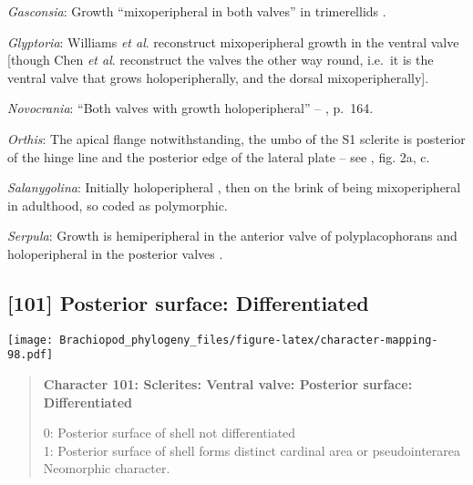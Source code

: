 \documentclass[openany]{book}
\theoremstyle{definition}
\theoremstyle{definition}
\theoremstyle{definition}
\theoremstyle{remark}
\begin{document}
\hypertarget{Gasconsia-coding-100}{}
\emph{Gasconsia}: Growth ``mixoperipheral in both valves'' in
trimerellids \citep{Williams2000LinguliformeaCraniiformea, Popov1997}.

\hypertarget{Glyptoria-coding-100}{}
\emph{Glyptoria}: Williams \emph{et al}.
\citeyearpar[2007]{Williams2000LinguliformeaCraniiformea} reconstruct
mixoperipheral growth in the ventral valve {[}though Chen \emph{et al}.
\citeyearpar{Chen2007Reinterpretationof} reconstruct the valves the
other way round, i.e.~it is the ventral valve that grows
holoperipherally, and the dorsal mixoperipherally{]}.

\hypertarget{Novocrania-coding-100}{}
\emph{Novocrania}: ``Both valves with growth holoperipheral'' --
\citet{Williams2000LinguliformeaCraniiformea}, p.~164.

\hypertarget{Orthis-coding-100}{}
\emph{Orthis}: The apical flange notwithstanding, the umbo of the S1
sclerite is posterior of the hinge line and the posterior edge of the
lateral plate -- see \citet{Larsson2014iPaterimitra}, fig. 2a, c.

\hypertarget{Salanygolina-coding-100}{}
\emph{Salanygolina}: Initially holoperipheral
\citep[p.~159]{Popov2009Earlyontogeny}, then on the brink of being
mixoperipheral in adulthood, so coded as polymorphic.

\hypertarget{Serpula-coding-100}{}
\emph{Serpula}: Growth is hemiperipheral in the anterior valve of
polyplacophorans and holoperipheral in the posterior valves
\citep{Schwabe2010, Connors2012}.

\subsection*{{[}101{]} Posterior surface:
Differentiated}\label{posterior-surface-differentiated-1}

\texttt{[image: Brachiopod\_phylogeny\_files/figure-latex/character-mapping-98.pdf]}

\begin{quote}
\textbf{Character 101: Sclerites: Ventral valve: Posterior surface:
Differentiated}

0: Posterior surface of shell not differentiated\\
1: Posterior surface of shell forms distinct cardinal area or
pseudointerarea\\
Neomorphic character.
\end{quote}
\end{document}
